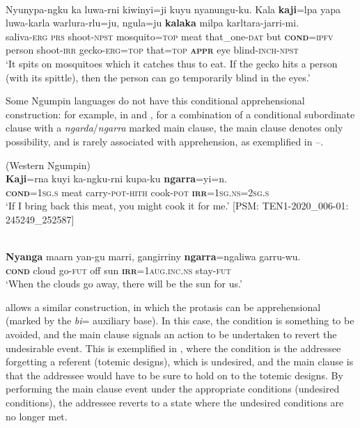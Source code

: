 \documentclass[output=paper,colorlinks,citecolor=brown]{langscibook}
\begin{document}
\ea 
{} \\
\gll Nyunypa-ngku ka luwa-rni kiwinyi=ji kuyu nyanungu-ku. Kala \textbf{kaji}=lpa yapa luwa-karla warlura-rlu=ju, ngula=ju \textbf{kalaka} milpa karltara-jarri-mi. \\
saliva-\textsc{erg} \textsc{prs} shoot-\textsc{npst} mosquito=\textsc{top} meat that\_one-\textsc{dat} but \textsc{\textbf{cond}=ipfv} person shoot-\textsc{irr} gecko-\textsc{erg=top} that=\textsc{top} \textsc{\textbf{appr}} eye blind-\textsc{inch-npst} \\
\glt `It spits on mosquitoes which it catches thus to eat. If the gecko hits a person (with its spittle), then the person can go temporarily blind in the eyes.' 
\label{ex:bro78}
\z

 Some Ngumpin languages do not have this conditional apprehensional construction: for example, in  and , for a combination of a conditional subordinate clause with a \textit{ngarda}/\textit{ngarra} marked main clause, the main clause denotes only possibility, and is rarely associated with apprehension, as exemplified in --.

\ea 
\textnormal{ (Western Ngumpin)} \\
\gll \textbf{Kaji}=rna kuyi ka-ngku-rni kupa-ku \textbf{ngarra}=yi=n. \\
\textsc{\textbf{cond}=1sg.s} meat carry-\textsc{pot-hith} cook-\textsc{pot} \textsc{\textbf{irr}=1sg.ns=2sg.s} \\
\glt `If I bring back this meat, you might cook it for me.' [PSM: TEN1-2020\_006-01: 245249\_252587]
\label{ex:bro79}
\z

\ea 
{} \\
\gll \textbf{Nyanga} maarn yan-gu marri, gangirriny \textbf{ngarra}=ngaliwa garru-wu. \\
\textsc{\textbf{cond}} cloud go-\textsc{fut} off sun \textsc{\textbf{irr}=1aug.inc.ns} stay-\textsc{fut} \\
\glt `When the clouds go away, there will be the sun for us.'
\label{ex:bro80}
\z


  allows a similar construction, in which the protasis can be apprehensional (marked by the \textit{bi}= auxiliary base). In this case, the condition is something to be avoided, and the main clause signals an action to be undertaken to revert the undesirable event. This is exemplified in , where the condition is the addressee forgetting a referent (totemic designs), which is undesired, and the main clause is that the addressee would have to be sure to hold on to the totemic designs. By performing the main clause event under the appropriate conditions (undesired conditions), the addressee reverts to a state where the undesired conditions are no longer met.
\end{document}
